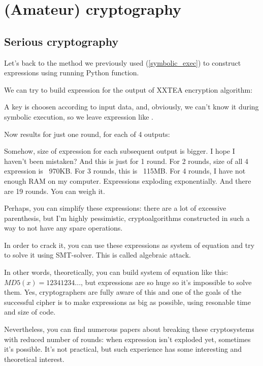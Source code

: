 \section{(Amateur) cryptography}

\subsection{Serious cryptography}

Let's back to the method we previously used (\ref{symbolic_exec}) to construct expressions using running Python function.

We can try to build expression for the output of XXTEA encryption algorithm:



A key is choosen according to input data, and, obviously, we can't know it during symbolic execution, so we leave expression like .

Now results for just one round, for each of 4 outputs:



Somehow, size of expression for each subsequent output is bigger. I hope I haven't been mistaken?
And this is just for 1 round.
For 2 rounds, size of all 4 expression is ~970KB.
For 3 rounds, this is ~115MB.
For 4 rounds, I have not enough RAM on my computer.
Expressions exploding exponentially.
And there are 19 rounds.
You can weigh it.

Perhaps, you can simplify these expressions: there are a lot of excessive parenthesis, but I'm highly pessimistic, cryptoalgorithms constructed in such a way to not have any
spare operations.

In order to crack it, you can use these expressions as system of equation and try to solve it using SMT-solver.
This is called algebraic attack.

In other words, theoretically, you can build system of equation like this: $MD5(x)=12341234...$, but expressions are so huge so it's impossible to solve them.
Yes, cryptographers are fully aware of this and one of the goals of the successful cipher is to make expressions as big as possible, using resonable time and size of code.

Nevertheless, you can find numerous papers about breaking these cryptosystems with reduced number of rounds: when expression isn't exploded yet, sometimes it's possible.
It's not practical, but such experience has some interesting and theoretical interest.

